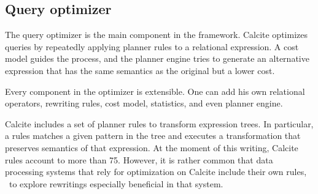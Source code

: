 \subsection{Query optimizer}
\label{subsec:optimizer}

The query optimizer is the main component in the framework. Calcite optimizes queries by repeatedly applying planner rules to a relational expression. A cost model guides the process, and the planner engine tries to generate an alternative expression that has the same semantics as the original but a lower cost.

Every component in the optimizer is extensible. One can add his own relational operators, rewriting rules, cost model, statistics, and even planner engine.

 Calcite includes a set of planner rules to transform expression trees. In particular, a rules matches a given pattern in the tree and executes a transformation that preserves semantics of that expression. At the moment of this writing, Calcite rules account to more than 75. However, it is rather common that data processing systems that rely for optimization on Calcite include their own rules, \eg\ to explore rewritings especially beneficial in that system.





